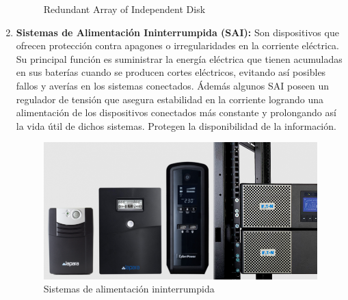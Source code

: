 \begin{enumerate}
\begin{figure}[H]
 \centering
 \caption{Redundant Array of Independent Disk}
 \label{f:raids}
\end{figure}

\item {\bfseries Sistemas de Alimentación Ininterrumpida (SAI):}
Son dispositivos que ofrecen protección contra apagones o irregularidades en la corriente eléctrica. Su principal función es suministrar la energía eléctrica que tienen acumuladas en sus baterías cuando se producen cortes eléctricos, evitando así posibles fallos y averías en los sistemas conectados. Ádemás algunos SAI poseen un regulador de tensión que asegura estabilidad en la corriente logrando una alimentación de los dispositivos conectados más constante y prolongando así la vida útil de dichos sistemas. Protegen la disponibilidad de la información.\cite{sai}

\begin{figure}[H]
  		   \centering
     		   \includegraphics[width=5.5in]{sais.png}
  		   \caption{ Sistemas de alimentación ininterrumpida \cite{sai2}}
  		   \label{img:SAIS}
\end{figure}


\end{enumerate}
